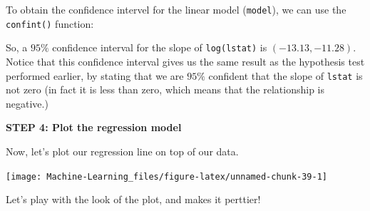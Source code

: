 \documentclass[]{book}
\newenvironment{Shaded}{\begin{snugshade}}{\end{snugshade}}
\newcommand{\KeywordTok}[1]{\textcolor[rgb]{0.13,0.29,0.53}{\textbf{#1}}}
\newcommand{\DataTypeTok}[1]{\textcolor[rgb]{0.13,0.29,0.53}{#1}}
\newcommand{\FloatTok}[1]{\textcolor[rgb]{0.00,0.00,0.81}{#1}}
\newcommand{\CommentTok}[1]{\textcolor[rgb]{0.56,0.35,0.01}{\textit{#1}}}
\newcommand{\OperatorTok}[1]{\textcolor[rgb]{0.81,0.36,0.00}{\textbf{#1}}}
\newcommand{\NormalTok}[1]{#1}
\theoremstyle{definition}
\theoremstyle{definition}
\theoremstyle{definition}
\theoremstyle{remark}
\begin{document}
\begin{Shaded}
\end{Shaded}

To obtain the confidence intervel for the linear model (\texttt{model}),
we can use the \texttt{confint()} function:

\begin{Shaded}
\end{Shaded}

So, a \(95\%\) confidence interval for the slope of \texttt{log(lstat)}
is \((-13.13, -11.28)\). Notice that this confidence interval gives us
the same result as the hypothesis test performed earlier, by stating
that we are \(95\%\) confident that the slope of \texttt{lstat} is not
zero (in fact it is less than zero, which means that the relationship is
negative.)

\textbf{STEP 4: Plot the regression model}

Now, let's plot our regression line on top of our data.

\begin{Shaded}
\end{Shaded}

\begin{center}\texttt{[image: Machine-Learning\_files/figure-latex/unnamed-chunk-39-1]} \end{center}

Let's play with the look of the plot, and makes it perttier!
\end{document}
